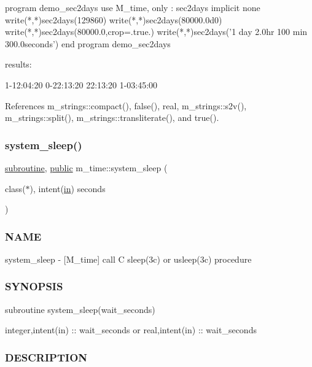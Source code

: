 \begin{DoxyVerb}
\begin{DoxyVerb}
 program demo_sec2days
 use M_time, only : sec2days
 implicit none
    write(*,*)sec2days(129860)
    write(*,*)sec2days(80000.0d0)
    write(*,*)sec2days(80000.0,crop=.true.)
    write(*,*)sec2days('1 day 2.0hr 100 min 300.0seconds')
 end program demo_sec2days

results:

 1-12:04:20
 0-22:13:20
 22:13:20
 1-03:45:00 \end{DoxyVerb}
 

References m\+\_\+strings\+::compact(), false(), real, m\+\_\+strings\+::s2v(), m\+\_\+strings\+::split(), m\+\_\+strings\+::transliterate(), and true().

\mbox{\label{namespacem__time_a7c5d028ae1e1e01162ffc7bb55dcbbb1}} 
\subsubsection{\texorpdfstring{system\+\_\+sleep()}{system\_sleep()}}
{\footnotesize\ttfamily \hyperlink{M__stopwatch_83_8txt_acfbcff50169d691ff02d4a123ed70482}{subroutine}, \hyperlink{M__stopwatch_83_8txt_a2f74811300c361e53b430611a7d1769f}{public} m\+\_\+time\+::system\+\_\+sleep (\begin{DoxyParamCaption}\item[{class($\ast$), intent(\hyperlink{M__journal_83_8txt_afce72651d1eed785a2132bee863b2f38}{in})}]{seconds }\end{DoxyParamCaption})}



\subsubsection*{N\+A\+ME}

system\+\_\+sleep -\/ \mbox{[}M\+\_\+time\mbox{]} call C sleep(3c) or usleep(3c) procedure \subsubsection*{S\+Y\+N\+O\+P\+S\+IS}

subroutine system\+\_\+sleep(wait\+\_\+seconds)

integer,intent(in) \+:\+: wait\+\_\+seconds or real,intent(in) \+:\+: wait\+\_\+seconds

\subsubsection*{D\+E\+S\+C\+R\+I\+P\+T\+I\+ON}


\end{DoxyVerb}
